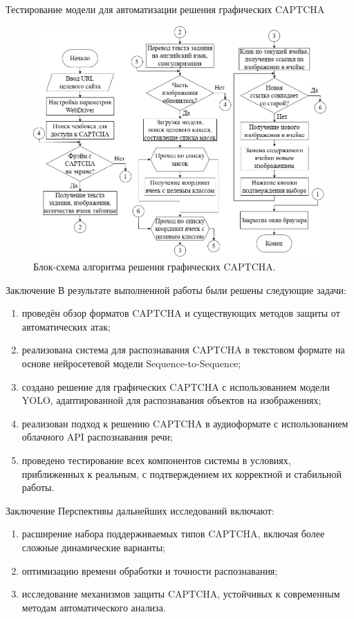 \documentclass[12pt,a4paper,mathserif]{beamer}
\begin{document}
\begin{frame}{\footnotesize Тестирование модели для автоматизации решения графических CAPTCHA}
    \begin{figure}
        \centering
        \includegraphics[width=0.7\linewidth]{imgs/solve_captcha_flow.png}
        \caption{\centering Блок-схема алгоритма решения графических CAPTCHA.}
    \end{figure}
\end{frame}

\begin{frame}{Заключение}
    \setlength{\parindent}{0.5cm}
    В результате выполненной работы были решены следующие задачи:

    \begin{enumerate}
        \item проведён обзор форматов CAPTCHA и существующих методов защиты от 
        автоматических атак;
        \item реализована система для распознавания CAPTCHA в текстовом формате 
        на основе нейросетевой модели Sequence-to-Sequence;
        \item создано решение для графических CAPTCHA с использованием модели 
        YOLO, адаптированной для распознавания объектов на изображениях;
        \item реализован подход к решению CAPTCHA в аудиоформате с использованием 
        облачного API распознавания речи;
        \item проведено тестирование всех компонентов системы в условиях, 
        приближенных к реальным, с подтверждением их корректной и стабильной 
        работы.
    \end{enumerate}
\end{frame}

\begin{frame}{Заключение}
    \setlength{\parindent}{0.5cm}
    Перспективы дальнейших исследований включают:

    \begin{enumerate}
        \item расширение набора поддерживаемых типов CAPTCHA, включая более 
        сложные динамические варианты;
        \item оптимизацию времени обработки и точности распознавания;
        \item исследование механизмов защиты CAPTCHA, устойчивых к современным 
        методам автоматического анализа.
    \end{enumerate}
\end{frame}
\end{document}
